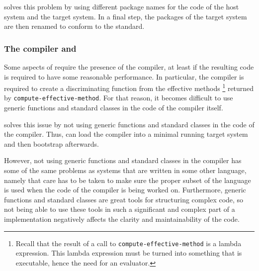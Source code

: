 \sbcl{} solves this problem by using different package names for the
code of the host system and the target system.  In a final step, the
packages of the target system are then renamed to conform to the
standard.

\subsubsection{The compiler and \clos{}}

Some aspects of \clos{} require the presence of the compiler, at least
if the resulting code is required to have some reasonable
performance.  In particular, the compiler is required to create a
discriminating function from the effective methods%
\footnote{Recall that the result of a call to
  \texttt{compute-effective-method} is a lambda expression.  This
  lambda expression must be turned into something that is executable,
  hence the need for an evaluator.}
returned by \texttt{compute-effective-method}.
For that reason, it becomes difficult to use generic
functions and standard classes in the code of the compiler itself.

\sbcl{} solves this issue by not using generic functions and standard
classes in the code of the compiler.  Thus, \sbcl{} can load the
compiler into a minimal running target system and then bootstrap
\clos{} afterwards.

However, not using generic functions and standard classes in the
compiler has some of the same problems as \commonlisp{} systems that
are written in some other language, namely that care has to be taken
to make sure the proper subset of the language is used when the code
of the compiler is being worked on.  Furthermore, generic functions
and standard classes are great tools for structuring complex code, so
not being able to use these tools in such a significant and complex
part of a \commonlisp{} implementation negatively affects the clarity
and maintainability of the code.
